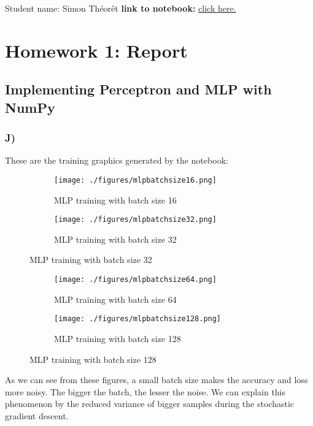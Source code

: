 \documentclass[12pt]{article}
\theoremstyle{definition}
\begin{document}
Student name: Simon Théorêt
\textbf{link to notebook:} \href{https://colab.research.google.com/drive/1473s94Jv_ti1Hddf0_Hh1R136zOeYhTv?usp=sharing}{click here.}
\vspace{0.2cm}
\section*{Homework 1: Report}
\subsection{Implementing Perceptron and MLP with NumPy}

\subsubsection*{J)} These are the training graphics generated by the notebook:

\begin{figure}[H]
  \centering
  \begin{subfigure}[b]{0.45\textwidth}
    \centering
    \texttt{[image: ./figures/mlpbatchsize16.png]}
    \caption{MLP training with batch size 16}
  \end{subfigure}
  \hfill
  \begin{subfigure}[b]{0.45\textwidth}
    \centering
    \texttt{[image: ./figures/mlpbatchsize32.png]}
    \caption{MLP training with batch size 32}
  \end{subfigure}
\end{figure}

\begin{figure}[H]
  \centering
  \begin{subfigure}[b]{0.45\textwidth}
    \centering
    \texttt{[image: ./figures/mlpbatchsize64.png]}
    \caption{MLP training with batch size 64}
  \end{subfigure}
  \hfill
  \begin{subfigure}[b]{0.45\textwidth}
    \centering
    \texttt{[image: ./figures/mlpbatchsize128.png]}
    \caption{MLP training with batch size 128}
  \end{subfigure}
\end{figure}
As we can see from these figures, a small batch size makes the accuracy and loss
more noisy. The bigger the batch, the lesser the noise. We can explain this
phenomenon by the reduced variance of bigger samples during the stochastic gradient descent.
\end{document}
